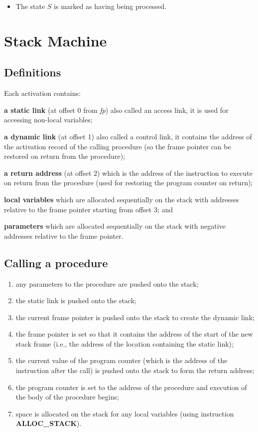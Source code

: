 \documentclass[fontsize=10pt,a4paper]{article}
\begin{document}
\begin{multicols}{3}
\begin{itemize}
        \item The state $S$ is marked as having being processed.

    \end{itemize}

    \section{Stack Machine}

    \subsection{Definitions}

    Each activation contains:

    \textbf{a static link} (at offset 0 from \textit{fp}) also called an access link, it is used for accessing non-local variables;

    \textbf{a dynamic link} (at offset 1) also called a control link, it contains the address of the activation record of the calling procedure (so the frame pointer can be restored on return from the procedure);

    \textbf{a return address} (at offset 2) which is the address of the instruction to execute on return from the procedure (used for restoring the program counter on return);

    \textbf{local variables} which are allocated sequentially on the stack with addresses relative to the frame pointer starting from offset 3; and

    \textbf{parameters} which are allocated sequentially on the stack with negative addresses relative to the frame pointer.

    \subsection{Calling a procedure}

    \begin{enumerate}
        \item any parameters to the procedure are pushed onto the stack;
        \item the static link is pushed onto the stack;
        \item the current frame pointer is pushed onto the stack to create the dynamic link;
        \item the frame pointer is set so that it contains the address of the start of the new stack frame (i.e., the address of the location containing the static link);
        \item the current value of the program counter (which is the address of the instruction after the call) is pushed onto the stack to form the return address;
        \item the program counter is set to the address of the procedure and execution of the body of the procedure begins;
        \item space is allocated on the stack for any local variables (using instruction \textbf{ALLOC\_STACK}).
    \end{enumerate}


\end{multicols}
\end{document}
